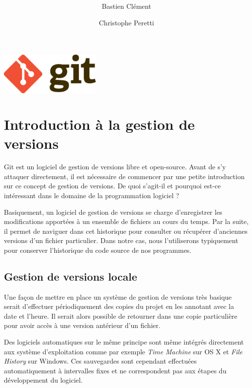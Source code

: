 \documentclass[11pt,a4paper]{article}
\author{Bastien Clément \and Christophe Peretti}
\title{{\normalsize \doccourse} \\ \doctitle }
\begin{document}

\maketitle

\vspace{3cm}
\begin{center}
\includegraphics[width=5cm]{git_logo}
\end{center}

\pagebreak
{}

\tableofcontents

\pagebreak
{}

\section{Introduction à la gestion de versions}

Git est un logiciel de gestion de versions libre et open-source.
Avant de s'y attaquer directement, il est nécessaire de commencer par une petite introduction sur ce concept de gestion de versions.
De quoi s'agit-il et pourquoi est-ce intéressant dans le domaine de la programmation logiciel ?

Basiquement, un logiciel de gestion de versions se charge d'enregistrer les modifications apportées à un ensemble de fichiers au cours du temps.
Par la suite, il permet de naviguer dans cet historique pour consulter ou récupérer d'anciennes versions d'un fichier particulier.
Dans notre cas, nous l'utiliserons typiquement pour conserver l'historique du code source de nos programmes.

\subsection{Gestion de versions locale}

Une façon de mettre en place un système de gestion de versions très basique serait d'effectuer périodiquement des copies du projet en les annotant avec la date et l'heure.
Il serait alors possible de retourner dans une copie particulière pour avoir accès à une version antérieur d'un fichier.

Des logiciels automatiques sur le même principe sont même intégrés directement aux système d'exploitation comme par exemple \textit{Time Machine} sur OS X et \textit{File History} sur Windows.
Ces sauvegardes sont cependant effectuées automatiquement à intervalles fixes et ne correspondent pas aux étapes du développement du logiciel.
\end{document}
